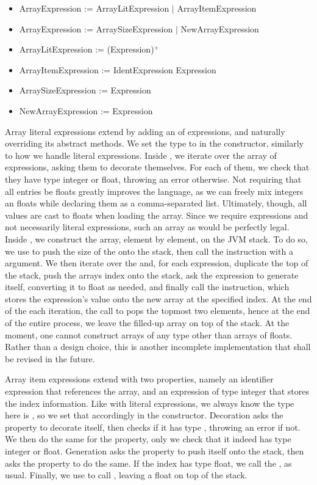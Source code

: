 \begin{itemize}
	\item ArrayExpression := ArrayLitExpression $|$ ArrayItemExpression
	\item ArrayExpression := ArraySizeExpression $|$ NewArrayExpression
	\item ArrayLitExpression := (Expression)$^+$
	\item ArrayItemExpression := IdentExpression Expression
	\item ArraySizeExpression := Expression
	\item NewArrayExpression := Expression
\end{itemize}

Array literal expressions extend  by adding an  of expressions, and naturally overriding its abstract methods. We set the type to  in the constructor, similarly to how we handle literal expressions. Inside , we iterate over the array of expressions, asking them to decorate themselves. For each of them, we check that they have type integer or float, throwing an error otherwise. Not requiring that all entries be floats greatly improves the language, as we can freely mix integers an floats while declaring them as a comma-separated list. Ultimately, though, all values are cast to floats when loading the array. Since we require expressions and not necessarily literal expressions, such an array as \il{[1, pow(2, 3.2), 3.5, pi]} would be perfectly legal. Inside , we construct the array, element by element, on the JVM stack. To do so, we use  to push the size of the  onto the stack, then call the  instruction with a  argument. We then iterate over the  and, for each expression, duplicate the top of the stack, push the arrays index onto the stack, ask the expression to generate itself, converting it to float as needed, and finally call the  instruction, which stores the expression's value onto the new array at the specified index. At the end of the each iteration, the call to  pops the topmost two elements, hence at the end of the entire process, we leave the filled-up array on top of the stack. At the moment, one cannot construct arrays of any type other than arrays of floats. Rather than a design choice, this is another incomplete implementation that shall be revised in the future.

Array item expressions extend  with two properties, namely an identifier expression that references the array, and an expression of type integer that stores the index information. Like with literal expressions, we always know the type here is , so we set that accordingly in the constructor. Decoration asks the  property to decorate itself, then checks if it has type , throwing an error if not. We then do the same for the  property, only we check that it indeed has type integer or float. Generation asks the  property to push itself onto the stack, then asks the  property to do the same. If the index has type float, we call the , as usual. Finally, we use  to call , leaving a float on top of the stack.

